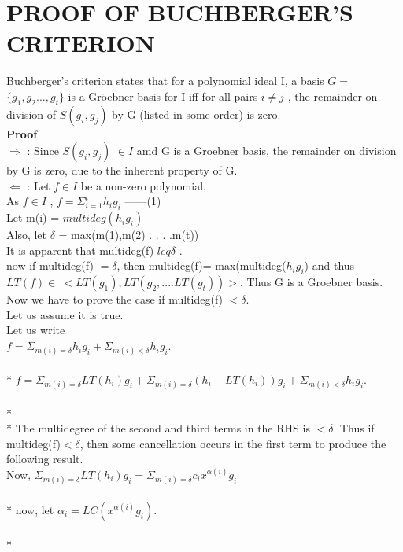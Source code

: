 \documentclass[12pt]{article}
\begin{document}
\section{PROOF OF BUCHBERGER'S CRITERION}
Buchberger's criterion states that for a polynomial ideal I, a basis $G=$ $\{g_{1},g_{2}...,g_{t}\}$ is a Gr\"{o}ebner basis for I iff for all pairs $i\neq j$ , the remainder on division of $S(g_{i},g_{j})$ by G (listed in some order) is zero.\\
{\bf Proof}\\
$\Rightarrow$ : Since  $ S(g_{i},g_{j})$ $ \in I$ amd G is a Groebner basis, the remainder on division by G is zero, due to the inherent property of G.\\
$\Leftarrow$ : Let $ f\in I$  be a non-zero polynomial.\\
As $f \in I$ , $ f= \Sigma^{t}_{i=1} h_{i}g_{i}$ ------(1)\\
Let m(i) = $multideg(h_{i}g_{i})$\\
Also, let $\delta$ = max(m(1),m(2) . . . .m(t))\\
It is apparent that multideg(f) $leq \delta$ .\\
now if multideg(f) $= \delta$, then multideg(f)= max(multideg($h_{i}g_{i}$) and thus\\ 
$LT(f) \in\ <LT(g_{1}), LT(g_{2},.... LT(g_{t}))>$. Thus G is a Groebner basis.\\
Now we have to prove the case if multideg(f) $< \delta$.\\
Let us assume it is true.\\
Let us write\\
$f= \Sigma_{m(i) = \delta} h_{i}g_{i} + \Sigma_{m(i) < \delta} h_{i}g_{i}$.\\\\*
$f= \Sigma_{m(i) = \delta} LT(h_{i})g_{i} + \Sigma_{m(i) = \delta} (h_{i}-LT(h_{i}))g_{i} + \Sigma_{m(i) < \delta} h_{i}g_{i}$.\\\\*
\\*
The multidegree of the second and third terms in the RHS is $< \delta$. Thus if multideg(f)$< \delta$, then some cancellation occurs in the first term to produce the following result.\\
Now, $\Sigma_{m(i)=\delta} LT(h_{i})g_{i} =  \Sigma_{m(i)=\delta} c_{i}x^{\alpha(i)}g_{i}$\\\\*
now, let $\alpha_{i} = LC(x^{\alpha(i)}g_{i})$.\\\\*
\end{document}
